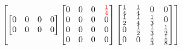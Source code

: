 {$$\begin{bmatrix}
\begin{bmatrix}
0 & 0 & 0 & 0 \\
0 & 0 & 0 & 0 \\
\end{bmatrix}
\begin{bmatrix}
0 & 0 & 0 & \textcolor{red}{\frac{1}{4}} \\
0 & 0 & 0 & 0 \\
0 & 0 & 0 & 0 \\
0 & 0 & 0 & 0 \\
\end{bmatrix}
\begin{bmatrix}
\frac{1}{4} & \frac{1}{4} & 0 & 0 \\
\frac{1}{2} & \frac{1}{4} & \frac{1}{3} & 0  \\
0 & \frac{1}{2} & \frac{1}{3} & \frac{1}{2} \\
0 & 0 & \frac{1}{3} & \frac{1}{8}  \\
\end{bmatrix}
\end{bmatrix}
$$

}

%



